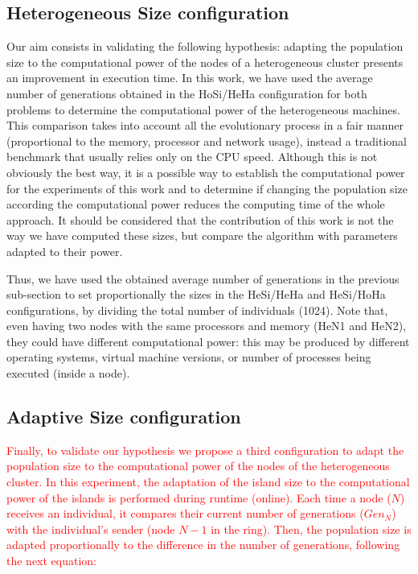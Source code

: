 \documentclass[final,1p,times]{elsarticle}
\begin{document}
\subsection{Heterogeneous Size configuration}

Our aim consists in validating the following hypothesis: adapting the population size to the computational power of the nodes of a heterogeneous cluster presents an improvement in execution time. In this work, we have used the average number of generations obtained in the HoSi/HeHa configuration for both problems to determine the computational power of the heterogeneous machines. This comparison takes into account all the evolutionary process in a fair manner (proportional to the memory, processor and network usage), instead a traditional benchmark that usually relies only on the CPU speed. Although this is not obviously the best way, it is a possible way to establish the computational power for the experiments of this work and to determine if changing the population size according the computational power reduces the computing time of the whole approach. It should be considered that the contribution of this work is not the way we have computed these sizes, but compare the algorithm with parameters adapted to their power.

Thus, we have used the obtained average number of generations in the previous sub-section to set proportionally the sizes in the HeSi/HeHa and HeSi/HoHa configurations, by dividing the total number of individuals (1024). Note that, even having two nodes with the same processors and memory (HeN1 and HeN2), they could have different computational power: this may be produced by different operating systems, virtual machine versions, or number of processes being executed (inside a node).



\subsection{Adaptive Size configuration}

\textcolor{red}{Finally, to validate our hypothesis we propose a third configuration to adapt the population size to the computational power of the nodes of the heterogeneous cluster. In this experiment, the adaptation of the island size to the computational power of the islands is performed during runtime (online).  Each time a node ($N$) receives an individual, it compares their current number of generations ($Gen_{N}$) with the individual's sender (node $N-1$ in the ring). Then, the population size is adapted proportionally to the difference in the number of generations, following the next equation:}
\end{document}
